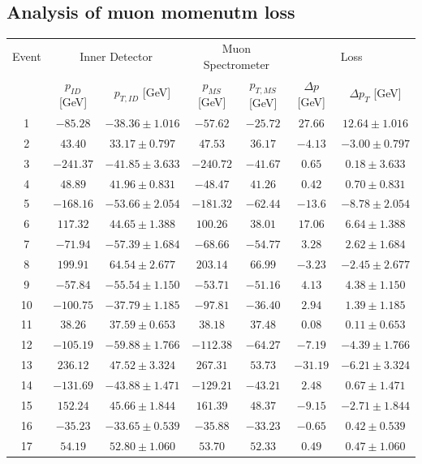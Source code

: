 \documentclass[twoside,        %
               BCOR12mm,       %
               ngerman,english, %
               fleqn,headsepline=false,footsepline=false
              ]{Vorlage/MFPREPORT}
\begin{document}
\subsection{Analysis of muon momenutm loss}
\begin{table}
  \centering
  \begin{tabular}{|c|c|c|c|c|c|c|}
  \hline
  Event&\multicolumn{2}{c|}{Inner Detector}&\multicolumn{2}{c|}{Muon Spectrometer}&\multicolumn{2}{c|}{Loss}\\
  &$p_{ID}$ [GeV]&$p_{T,ID}$ [GeV]&$p_{MS}$ [GeV]&$p_{T,MS}$
  [GeV]&$\Delta{{p}}$ [GeV]&$\Delta{{p}_{T}}$ [GeV]\\
  \hline
  1&$-85.28$&$-38.36\pm 1.016$&$-57.62$&$-25.72$&$27.66$&$12.64\pm 1.016$\\
  2&$43.40$&$33.17\pm 0.797$&$47.53$&$36.17$&$-4.13$&$-3.00\pm 0.797$\\
  3&$-241.37$&$-41.85\pm 3.633$&$-240.72$&$-41.67$&$0.65$&$0.18\pm 3.633$\\
  4&$48.89$&$41.96\pm 0.831$&$-48.47$&$41.26$&$0.42$&$0.70\pm 0.831$\\
  5&$-168.16$&$-53.66\pm 2.054$&$-181.32$&$-62.44$&$-13.6$&$-8.78\pm 2.054$\\
  6&$117.32$&$44.65\pm 1.388$&$100.26$&$38.01$&$17.06$&$6.64\pm 1.388$\\
  7&$-71.94$&$-57.39\pm 1.684$&$-68.66$&$-54.77$&$3.28$&$2.62\pm 1.684$\\
  8&$199.91$&$64.54\pm 2.677$&$203.14$&$66.99$&$-3.23$&$-2.45 \pm 2.677$\\
  9&$-57.84$&$-55.54\pm 1.150$&$-53.71$&$-51.16$&$4.13$&$4.38\pm 1.150$\\
  10&$-100.75$&$-37.79\pm 1.185$&$-97.81$&$-36.40$&$2.94$&$1.39\pm 1.185$\\
  11&$38.26$&$37.59\pm 0.653$&$38.18$&$37.48$&$0.08$&$0.11\pm 0.653$\\
  12&$-105.19$&$-59.88\pm 1.766$&$-112.38$&$-64.27$&$-7.19$&$-4.39\pm 1.766$\\
  13&$236.12$&$47.52\pm 3.324$&$267.31$&$53.73$&$-31.19$&$-6.21\pm 3.324$\\
  14&$-131.69$&$-43.88\pm 1.471$&$-129.21$&$-43.21$&$2.48$&$0.67\pm 1.471$\\
  15&$152.24$&$45.66\pm 1.844$&$161.39$&$48.37$&$-9.15$&$-2.71\pm 1.844$\\
  16&$-35.23$&$-33.65\pm 0.539$&$-35.88$&$-33.23$&$-0.65$&$0.42\pm 0.539$\\
  17&$54.19$&$52.80\pm 1.060$&$53.70$&$52.33$&$0.49$&$0.47\pm 1.060$\\

\end{tabular}
\end{table}
\end{document}
